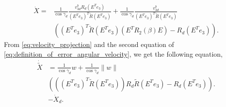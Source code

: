 \begin{align}
    \label{eq:translation_dynamics_of_yz_without_second_term_transformation_2}
    \dot{X} = &\frac{1}{\cos \gamma_d} \frac{v_{3d}^b R_d (E^T e_3)}{(E^T e_3)^T \tilde{R} (E^T e_3)} + \frac{1}{\cos \gamma_d} \frac{v_{3d}^b}{(E^T e_3)^T \tilde{R} (E^T e_3)} \\
    &\left ( (E^T e_3)^T \tilde{R} (E^T e_3) (E^T R_2(\beta) E) - R_d(E^T e_3) \right ).
\end{align}
From \eqref{eq:velocity_projection} and the second equation of \eqref{eq:definition_of_error_angular_velocity}, we get the following equation,
\begin{align}
    \dot{\tilde{X}} &= \frac{1}{\cos \gamma_d} w + \frac{1}{\cos \gamma_d} \|w\| \\
    & \left ( \left ( \left (E^T e_3 \right )^T \tilde{R} \left (E^T e_3 \right ) \right ) R_d \tilde{R} \left (E^T e_3 \right ) - R_d \left (E^T e_3 \right ) \right ). \\
    &- \dot{X}_d.
    \label{eq:error_translation_dynamics_of_yz_without_second_term}
\end{align}
